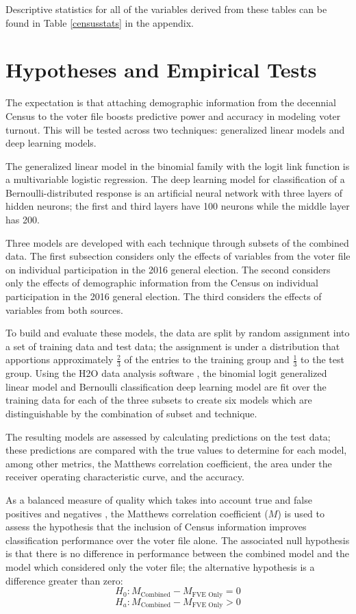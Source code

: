 \documentclass[12pt]{article}
\begin{document}
Descriptive statistics for all of the variables derived from these tables can be found in Table \ref{censusstats} in the appendix.

\section{Hypotheses and Empirical Tests}
The expectation is that attaching demographic information from the decennial Census to the voter file boosts predictive power and accuracy in modeling voter turnout. This will be tested across two techniques: generalized linear models and deep learning models.

The generalized linear model in the binomial family with the logit link function is a multivariable logistic regression. The deep learning model for classification of a Bernoulli-distributed response is an artificial neural network with three layers of hidden neurons; the first and third layers have 100 neurons while the middle layer has 200.

Three models are developed with each technique through subsets of the combined data. The first subsection considers only the effects of variables from the voter file on individual participation in the 2016 general election. The second considers only the effects of demographic information from the Census on individual participation in the 2016 general election. The third considers the effects of variables from both sources.

To build and evaluate these models, the data are split by random assignment into a set of training data and test data; the assignment is under a distribution that apportions approximately $\frac{2}{3}$ of the entries to the training group and $\frac{1}{3}$ to the test group. Using the H2O data analysis software \cite{Kraljevic:2018aa}, the binomial logit generalized linear model and Bernoulli classification deep learning model are fit over the training data for each of the three subsets to create six models which are distinguishable by the combination of subset and technique.

The resulting models are assessed by calculating predictions on the test data; these predictions are compared with the true values to determine for each model, among other metrics, the Matthews correlation coefficient, the area under the receiver operating characteristic curve, and the accuracy.

As a balanced measure of quality which takes into account true and false positives and negatives \cite{Chicco:2017aa}, the Matthews correlation coefficient ($M$) is used to assess the hypothesis that the inclusion of Census information improves classification performance over the voter file alone. The associated null hypothesis is that there is no difference in performance between the combined model and the model which considered only the voter file; the alternative hypothesis is a difference greater than zero:
$$H_0: M_{\text{Combined}} - M_{\text{FVE Only}} = 0$$
$$H_a: M_{\text{Combined}} - M_{\text{FVE Only}} > 0$$
\end{document}
